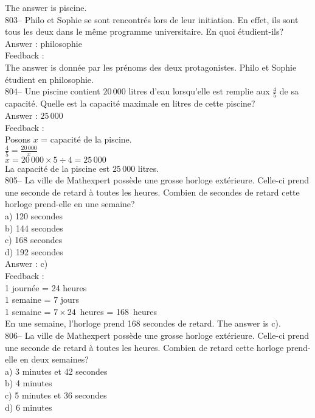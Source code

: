 ﻿\documentclass[letterpaper, 12pt]{article}
\begin{document}
The answer is piscine.\\

803-- Philo et Sophie se sont rencontr\'es lors de leur initiation. En
effet, ils sont tous les deux dans le m\^eme programme universitaire.  En
quoi \'etudient-ils?\\

Answer : philosophie\\

Feedback : \\
The answer is donn\'ee par les pr\'enoms des deux protagonistes.  Philo
et Sophie \'etudient en philosophie.\\

804-- Une piscine contient $20\,000$ litres d'eau lorsqu'elle est remplie
aux $\frac{4}{5}$ de sa capacit\'e. Quelle est la capacit\'e maximale en
litres de cette piscine?\\

Answer : $25\,000$\\

Feedback : \\
Posons $x$ = capacit\'e de la piscine.\\
$\frac{4}{5}=\frac{20\,000}{x}$\\
$x=20\,000\times5\div4=25\,000$\\
La capacit\'e de la piscine est $25\,000$ litres.\\

805-- La ville de Mathexpert poss\`ede une grosse horloge ext\'erieure.
Celle-ci prend une seconde de retard \`a toutes les heures.  Combien de
secondes de retard cette horloge prend-elle en une semaine?\\
a) 120 secondes\\
b) 144 secondes\\
c) 168 secondes\\
d) 192 secondes\\

Answer : c)\\

Feedback : \\
1 journ\'ee = 24 heures\\
1 semaine = 7 jours\\
1 semaine = $7\times24$~heures = 168~heures\\
En une semaine, l'horloge prend 168 secondes de retard.  The answer is
c).\\

806-- La ville de Mathexpert poss\`ede une grosse horloge ext\'erieure.
Celle-ci prend une seconde de retard \`a toutes les heures.  Combien de
retard cette horloge prend-elle en deux semaines?\\
a) 3 minutes et 42 secondes\\
b) 4 minutes\\
c) 5 minutes et 36 secondes\\
d) 6 minutes\\
\end{document}
